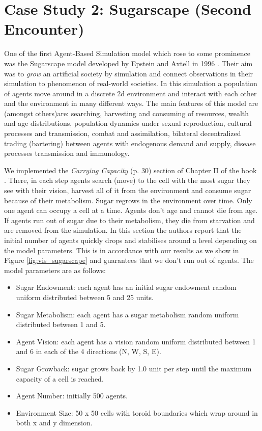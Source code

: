 \section{Case Study 2: Sugarscape (Second Encounter)}
\label{sec:cs_sugarscape}

One of the first  Agent-Based Simulation model which rose to some prominence was the Sugarscape model developed by Epstein and Axtell in 1996 \cite{epstein_growing_1996}. Their aim was to \textit{grow} an artificial society by simulation and connect observations in their simulation to phenomenon of real-world societies. In this simulation a population of agents move around in a discrete 2d environment and interact with each other and the environment in many different ways. The main features of this model are (amongst others)are: searching, harvesting and consuming of resources, wealth and age distributions, population dynamics under sexual reproduction, cultural processes and transmission, combat and assimilation, bilateral decentralized trading (bartering) between agents with endogenous demand and supply, disease processes transmission and immunology.

We implemented the \textit{Carrying Capacity} (p. 30) section of Chapter II of the book \cite{epstein_growing_1996}. There, in each step agents search (move) to the cell with the most sugar they see with their vision, harvest all of it from the environment and consume sugar because of their metabolism. Sugar regrows in the environment over time. Only one agent can occupy a cell at a time. Agents don't age and cannot die from age. If agents run out of sugar due to their metabolism, they die from starvation and are removed from the simulation. In this section the authors report that the initial number of agents quickly drops and stabilises around a level depending on the model parameters. This is in accordance with our results as we show in Figure \ref{fig:vis_sugarscape} and guarantees that we don't run out of agents. The model parameters are as follows:

\begin{itemize}
	\item Sugar Endowment: each agent has an initial sugar endowment random uniform distributed between 5 and 25 units.
	\item Sugar Metabolism: each agent has a sugar metabolism random uniform distributed between 1 and 5.
	\item Agent Vision: each agent has a vision random uniform distributed between 1 and 6 in each of the 4 directions (N, W, S, E). 
	\item Sugar Growback: sugar grows back by 1.0 unit per step until the maximum capacity of a cell is reached.
	\item Agent Number: initially 500 agents.
	\item Environment Size: 50 x 50 cells with toroid boundaries which wrap around in both x and y dimension.
\end{itemize}


